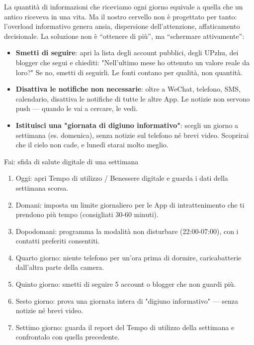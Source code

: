 
La quantità di informazioni che riceviamo ogni giorno equivale a quella che un antico riceveva in una vita. Ma il nostro cervello non è progettato per tanto: l'overload informativo genera ansia, dispersione dell'attenzione, affaticamento decisionale. La soluzione non è “ottenere di più”, ma “schermare attivamente”:

\begin{itemize}
  \item \textbf{Smetti di seguire}: apri la lista degli account pubblici, degli UPzhu, dei blogger che segui e chiediti: "Nell'ultimo mese ho ottenuto un valore reale da loro?" Se no, smetti di seguirli. Le fonti contano per qualità, non quantità.
  \item \textbf{Disattiva le notifiche non necessarie}: oltre a WeChat, telefono, SMS, calendario, disattiva le notifiche di tutte le altre App. Le notizie non servono push — quando le vai a cercare, le vedi.
  \item \textbf{Istituisci una "giornata di digiuno informativo"}: scegli un giorno a settimana (es. domenica), senza notizie sul telefono né brevi video. Scoprirai che il cielo non cade, e lunedì starai molto meglio.
\end{itemize}

\begin{tcbpractice}{Fai: sfida di salute digitale di una settimana}
\begin{enumerate}
  \item Oggi: apri Tempo di utilizzo / Benessere digitale e guarda i dati della settimana scorsa.
  \item Domani: imposta un limite giornaliero per le App di intrattenimento che ti prendono più tempo (consigliati 30-60 minuti).
  \item Dopodomani: programma la modalità non disturbare (22:00-07:00), con i contatti preferiti consentiti.
  \item Quarto giorno: niente telefono per un'ora prima di dormire, caricabatterie dall'altra parte della camera.
  \item Quinto giorno: smetti di seguire 5 account o blogger che non guardi più.
  \item Sesto giorno: prova una giornata intera di "digiuno informativo" — senza notizie né brevi video.
  \item Settimo giorno: guarda il report del Tempo di utilizzo della settimana e confrontalo con quella precedente.
\end{enumerate}

\end{tcbpractice}

